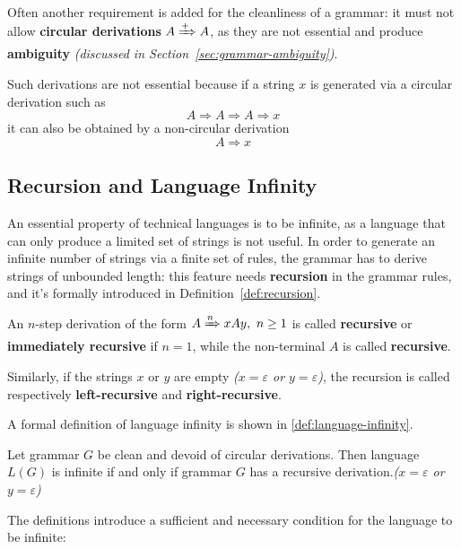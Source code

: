 \documentclass[english]{article}
\begin{document}
\bigskip
Often another requirement is added for the cleanliness of a grammar: it must not allow \textbf{circular derivations} \(A \xRightarrow{+} A\), as they are not essential and produce \textbf{ambiguity} \textit{(discussed in Section~\ref{sec:grammar-ambiguity})}.

Such derivations are not essential because if a string \(x\) is generated via a circular derivation such as
\[ A \Rightarrow A \Rightarrow A \Rightarrow x \]
it can also be obtained by a non-circular derivation
\[ A \Rightarrow x \]

\subsection{Recursion and Language Infinity}

An essential property of technical languages is to be infinite, as a language that can only produce a limited set of strings is not useful.
In order to generate an infinite number of strings via a finite set of rules, the grammar has to derive strings of unbounded length:
this feature needs \textbf{recursion} in the grammar rules, and it's formally introduced in Definition~\ref{def:recursion}.

\begin{definition}[Recursion]
  \label{def:recursion}
  An \(n\)-step derivation of the form \(A \xRightarrow{n} x A y, \ n \geq 1\) is called \textbf{recursive} or \textbf{immediately recursive} if \(n=1\), while the non-terminal \(A\) is called \textbf{recursive}.

  Similarly, if the strings \(x\) or \(y\) are empty \textit{(\(x=\varepsilon\) or \(y=\varepsilon\))}, the recursion is called respectively \textbf{left-recursive} and \textbf{right-recursive}.
\end{definition}

A formal definition of language infinity is shown in \ref{def:language-infinity}.

\begin{definition}
  Let grammar \(G\) be clean and devoid of circular derivations.
  Then language \(L(G)\) is infinite if and only if grammar \(G\) has a recursive derivation.\textit{(\(x=\varepsilon\) or \(y=\varepsilon\))}
  \label{def:language-infinity}
\end{definition}

\bigskip
The definitions introduce a sufficient and necessary condition for the language to be infinite:
\end{document}
